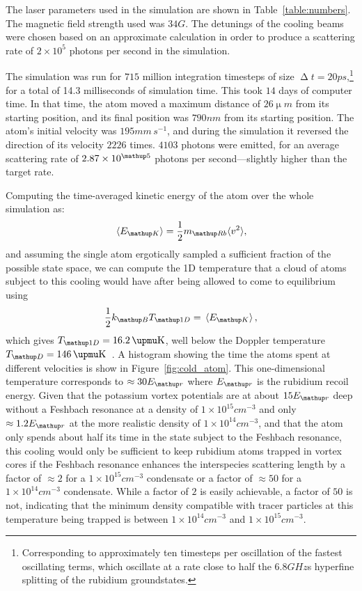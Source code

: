 The laser parameters used in the simulation are shown in Table~\ref{table:numbers}. The magnetic field strength used was $34\unit{G}$. The detunings of the cooling beams were chosen based on an approximate calculation in order to produce a scattering rate of $2\times10^{5}$ photons per second in the simulation.

The simulation was run for $715$ million integration timesteps of size $\upDelta t=20\unit{ps}$,\footnote{Corresponding to approximately ten timesteps per oscillation of the fastest oscillating terms, which oscillate at a rate close to half the $6.8\unit{GHz}$s hyperfine splitting of the rubidium groundstates.} for a total of 14.3 milliseconds of simulation time. This took $14$ days of computer time. In that time, the atom moved a maximum distance of $26\unit{\upmu m}$ from its starting position, and its final position was $790\unit{nm}$ from its starting position. The atom's initial velocity was $195 \unit{mm\,s}^{-1}$, and during the simulation it reversed the direction of its velocity $2226$ times. $4103$ photons were emitted, for an average scattering rate of $2.87\times10^\up{5}$ photons per second---slightly higher than the target rate.

Computing the time-averaged kinetic energy of the atom over the whole simulation as:
\begin{equation}
\ev{E_\up{K}} = \frac12 m_\up{Rb} \langle v^2 \rangle,
\end{equation}
and assuming the single atom ergotically sampled a sufficient fraction of the possible state space, we can compute the 1D temperature that a cloud of atoms subject to this cooling would have after being allowed to come to equilibrium using
\begin{align}
\frac12 k_\up{B} T_\up{1D} = \ev{E_\up{K}},
\end{align}
which gives  $T_\up{1D} = 16.2\unit{\upmu K}$, well below the Doppler temperature $T_\up{D} = 146\unit{\upmu K}$~\cite{steck_rubidium_2015}. A histogram showing the time the atoms spent at different velocities is show in Figure~\ref{fig:cold_atom}. This one-dimensional temperature corresponds to $\approx30E_\up{r}$ where $E_\up{r}$ is the rubidium recoil energy. Given that the potassium vortex potentials are at about $15E_\up{r}$ deep without a Feshbach resonance at a density of $1\times10^{15}\unit{cm}^{-3}$ and only $\approx 1.2E_\up{r}$ at the more realistic density of $1\times10^{14}\unit{cm}^{-3}$, and that the atom only spends about half its time in the state subject to the Feshbach resonance, this cooling would only be sufficient to keep rubidium atoms trapped in vortex cores if the Feshbach resonance enhances the interspecies scattering length by a factor of $\approx 2$ for a $1\times10^{15}\unit{cm}^{-3}$ condensate or a factor of $\approx 50$ for a $1\times10^{14}\unit{cm}^{-3}$ condensate. While a factor of $2$ is easily achievable, a factor of $50$ is not, indicating that the minimum density compatible with tracer particles at this temperature being trapped is between $1\times10^{14}\unit{cm}^{-3}$ and $1\times10^{15}\unit{cm}^{-3}$.

